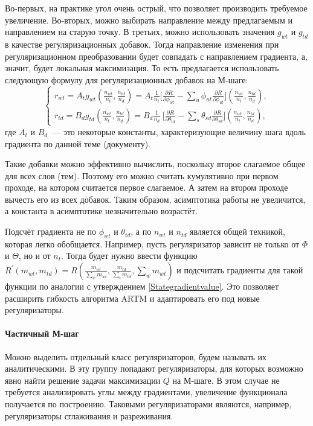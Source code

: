 \documentclass[12pt, twoside]{article}
\begin{document}
Во-первых, на практике угол очень острый, что позволяет производить требуемое увеличение. Во-вторых, можно выбирать направление между предлагаемым  и направлением на старую точку. В третьих, можно использовать значения $g_{wt}$ и $g_{td}$ в качестве регуляризационных добавок. Тогда направление изменения при регуляризационном преобразовании будет совпадать с направлением градиента, а, значит, будет локальная максимизация. То есть предлагается использовать следующую формулу для регуляризационных добавок на М-шаге:
\[
\left\{
	\begin{aligned}
		r_{wt} =  A_t g_{wt}\left(\frac{n_{wt}}{n_t}, \frac{n_{td}}{n_d}\right) = A_t \frac{1}{n_t} \bigg[{\frac{\partial{R}}{\partial{\phi_{wt}}} - \sum\limits_u \phi_{ut} \frac{\partial{R}}{\partial{\phi_{ut}}} }\bigg] \left(\frac{n_{wt}}{n_t}, \frac{n_{td}}{n_d}\right),\\
		r_{td} =  B_d g_{td} \left(\frac{n_{wt}}{n_t}, \frac{n_{td}}{n_d}\right) = B_d \frac{1}{n_d} \ \bigg[ {\frac{\partial{R}}{\partial{\theta_{td}}} - \sum\limits_s \theta_{sd} \frac{\partial{R}}{\partial{\theta_{sd}}} }\bigg] \left(\frac{n_{wt}}{n_t}, \frac{n_{td}}{n_d}\right) ,
	\end{aligned}
\right.
\]
где $A_t$ и $B_d$~--- это некоторые константы, характеризующие величину шага вдоль градиента по данной теме (документу).

Такие добавки можно эффективно вычислить, поскольку второе слагаемое общее для всех слов (тем). Поэтому его можно считать кумулятивно при первом проходе, на котором считается первое слагаемое. А затем на втором проходе вычесть его из всех добавок. Таким образом, асимптотика работы не увеличится, а константа в асимптотике незначительно возрастёт.

Подсчёт градиента не по $\phi_{wt}$ и $\theta_{td}$, а по $n_{wt}$ и $n_{td}$ является общей техникой, которая легко обобщается. Например, пусть регуляризатор зависит не только от $\Phi$ и $\Theta$, но и от $n_t$. Тогда будет нужно ввести функцию $R^{\prime}(m_{wt}, m_{td}) = R\left( \frac{m_{wt}}{\sum\limits_w m_{wt}},  \frac{m_{td}}{\sum\limits_t m_{td}}, \sum\limits_w m_{wt}\right)$ и подсчитать градиенты для такой функции по аналогии с утверждением \ref{Stategradientvalue}. Это позволяет расширить гибкость алгоритма ARTM и адаптировать его под новые регуляризаторы.

           \paragraph{Частичный М-шаг}
Можно выделить отдельный класс регуляризаторов, будем называть их аналитическими. В эту группу попадают регуляризаторы, для которых возможно явно найти решение  задачи  максимизации  $Q$ на М-шаге. В этом случае не требуется анализировать углы между градиентами, увеличение функционала получается по построению. Таковыми регуляризаторами являются, например, регуляризаторы сглаживания и разреживания. 
\end{document}
